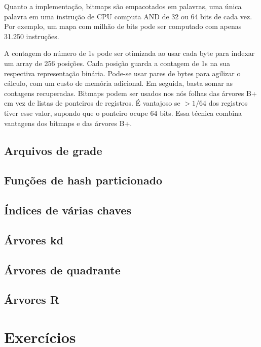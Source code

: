 Quanto a implementação, bitmaps são empacotados em palavras, uma única palavra 
em uma instrução de CPU computa AND de 32 ou 64 bits de cada vez.
Por exemplo, um mapa com milhão de bits pode ser computado com apenas
31.250 instruções.

A contagem do número de 1s pode ser otimizada ao usar cada byte para indexar
um array de 256 posições.
Cada posição guarda a contagem de 1s na sua respectiva representação binária. 
Pode-se usar pares de bytes para agilizar o cálculo, com um custo
de memória adicional.
Em seguida, basta somar as contagens recuperadas.
Bitmaps podem ser usados nos nós folhas das árvores B+ em vez de listas 
de ponteiros de registros.
É vantajoso se $> 1/64$ dos registros tiver esse valor, supondo que o ponteiro
ocupe 64 bits.
Essa técnica combina vantagens dos bitmaps e das árvores B+.

\subsection{Arquivos de grade}

\subsection{Funções de hash particionado}

\subsection{Índices de várias chaves}

\subsection{Árvores kd}

\subsection{Árvores de quadrante}

\subsection{Árvores R}

\section{Exercícios}

